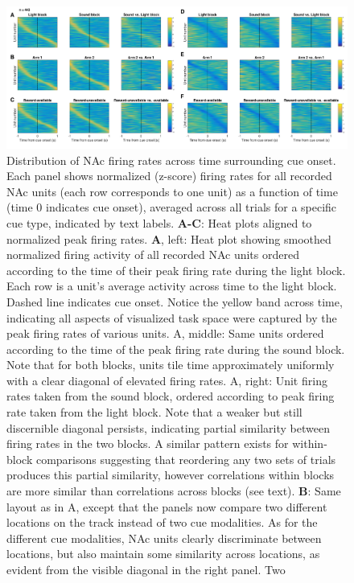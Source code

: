 \documentclass[11pt]{article}
\newcommand{\bsf}[1]{\textbf{#1}}
\providecommand{\DIFaddbeginFL}{} %
\providecommand{\DIFaddendFL}{} %
\providecommand{\DIFdelbeginFL}{} %
\providecommand{\DIFdelendFL}{} %
\newcommand{\DIFscaledelfig}{0.5}
\newlength{\DIFdelgraphicswidth} %
\newlength{\DIFdelgraphicsheight} %
\newcommand{\DIFaddincludegraphics}[2][]{{\color{blue}\fbox{\DIFOincludegraphics[#1]{#2}}}} %
\newcommand{\DIFdelincludegraphics}[2][]{%
\sbox{\DIFdelgraphicsbox}{\DIFOincludegraphics[#1]{#2}}%
\settoboxwidth{\DIFdelgraphicswidth}{\DIFdelgraphicsbox} %
\settoboxtotalheight{\DIFdelgraphicsheight}{\DIFdelgraphicsbox} %
\scalebox{\DIFscaledelfig}{%
\parbox[b]{\DIFdelgraphicswidth}{\usebox{\DIFdelgraphicsbox}\\[-\baselineskip] \rule{\DIFdelgraphicswidth}{0em}}\llap{\resizebox{\DIFdelgraphicswidth}{\DIFdelgraphicsheight}{%
\setlength{\unitlength}{\DIFdelgraphicswidth}%
\begin{picture}(1,1)%
\thicklines\linethickness{2pt} %
{\color[rgb]{1,0,0}\put(0,0){\framebox(1,1){}}}%
{\color[rgb]{1,0,0}\put(0,0){\line( 1,1){1}}}%
{\color[rgb]{1,0,0}\put(0,1){\line(1,-1){1}}}%
\end{picture}%
}\hspace*{3pt}}} %
} %
\DeclareRobustCommand{\DIFaddbeginFL}{\DIFOaddbeginFL \let\includegraphics\DIFaddincludegraphics} %
\DeclareRobustCommand{\DIFaddendFL}{\DIFOaddendFL \let\includegraphics\DIFOincludegraphics} %
\DeclareRobustCommand{\DIFdelbeginFL}{\DIFOdelbeginFL \let\includegraphics\DIFdelincludegraphics} %
\DeclareRobustCommand{\DIFdelendFL}{\DIFOaddendFL \let\includegraphics\DIFOincludegraphics} %
\begin{document}
\begin{figure}
[h]
\centering
\DIFdelbeginFL %
\DIFdelendFL \DIFaddbeginFL \includegraphics[width=\textwidth]{Fig 8 - Task tiling.png}
\DIFaddendFL \caption{Distribution of NAc firing rates across time surrounding cue
onset. Each panel shows normalized (z-score) firing rates for all recorded NAc
units (each row corresponds to one unit) as a function of time (time 0
indicates cue onset), averaged across all trials for a specific cue type,
indicated by text labels. \bsf{A-C}: Heat plots aligned to normalized peak
firing rates. \bsf{A}, left: Heat plot showing smoothed normalized firing
activity of all recorded NAc units ordered according to the time of their peak
firing rate during the light block. Each row is a unit’s average activity
across time to the light block. Dashed line indicates cue onset. Notice the
yellow band across time, indicating all aspects of visualized task space were
captured by the peak firing rates of various units. A, middle: Same units
ordered according to the time of the peak firing rate during the sound
block. Note that for both blocks, units tile time approximately uniformly with
a clear diagonal of elevated firing rates. A, right: Unit firing rates
taken from the sound block, ordered according to peak firing rate taken from
the light block. Note that a weaker but still discernible diagonal persists,
indicating partial similarity between firing rates in the two blocks. A similar pattern exists for within-block comparisons suggesting that reordering any two sets of trials
produces this partial similarity, however correlations within blocks are more
similar than correlations across blocks (see text). \bsf{B}: Same layout as in
A, except that the panels now compare two different locations on the track
instead of two cue modalities. As for the different cue modalities, NAc units
clearly discriminate between locations, but also maintain some similarity
across locations, as evident from the visible diagonal in the right panel. Two
}
\end{figure}
\end{document}
